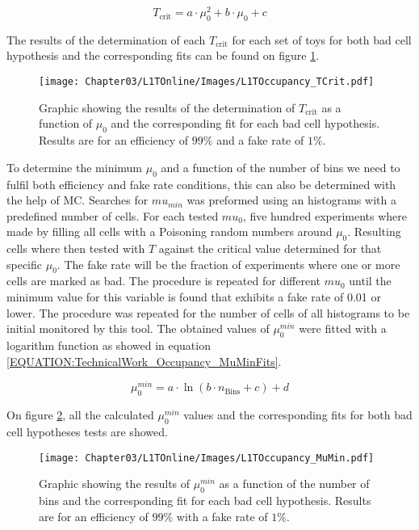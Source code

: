 \begin{equation}
T_{\text{crit}}=a \cdot \mu_0^2 + b \cdot \mu_0 + c
\label{EQUATION:TechnicalWork_Occupancy_Chi2Fits}
\end{equation}

The results of the determination of each $T_{\text{crit}}$ for each set of toys for both bad cell hypothesis and the corresponding fits can be found on figure \ref{FIGURE:TechnicalWork_L1TOccupancyTCrit}.

\begin{figure}[!htb]
\centering
\texttt{[image: Chapter03/L1TOnline/Images/L1TOccupancy\_TCrit.pdf]}
\caption{Graphic showing the results of the determination of $T_{\text{crit}}$ as a function of $\mu_0$ and the corresponding fit for each bad cell hypothesis. Results are for an efficiency of $99\%$ and a fake rate of $1\%$.}
\label{FIGURE:TechnicalWork_L1TOccupancyTCrit}
\end{figure}

To determine the minimum $\mu_0$ and a function of the number of bins we need to fulfil both efficiency and fake rate conditions, this can also be determined with the help of \gls{MC}. Searches for $mu_{min}$ was preformed using an histograms with a predefined number of cells. For each tested $mu_{0}$, five hundred experiments where made by filling all cells with a Poisoning random numbers around $\mu_0$. Resulting cells where then tested with $T$ against the critical value determined for that specific $\mu_0$. The fake rate will be the fraction of experiments where one or more cells are marked as bad. The procedure is repeated for different $mu_{0}$ until the minimum value for this variable is found that exhibits a fake rate of 0.01 or lower. The procedure was repeated for the number of cells of all histograms to be initial monitored by this tool. The obtained values of $\mu_0^{min}$ were fitted with a logarithm function as showed in equation \ref{EQUATION:TechnicalWork_Occupancy_MuMinFits}.

\begin{equation}
\mu_{0}^{min}= a \cdot \ln(b \cdot n_{\text{Bins}} + c) + d
\label{EQUATION:TechnicalWork_Occupancy_MuMinFits}
\end{equation}

On figure \ref{FIGURE:TechnicalWork_L1TOccupancyMuMin}, all the calculated $\mu_0^{min}$ values and the corresponding fits for both bad cell hypotheses tests are showed.

\begin{figure}[!htb]
\centering
\texttt{[image: Chapter03/L1TOnline/Images/L1TOccupancy\_MuMin.pdf]}
\caption{Graphic showing the results of $\mu_0^{min}$ as a function of the number of bins and the corresponding fit for each bad cell hypothesis. Results are for an efficiency of $99\%$ with a fake rate of $1\%$.}
\label{FIGURE:TechnicalWork_L1TOccupancyMuMin}
\end{figure}

